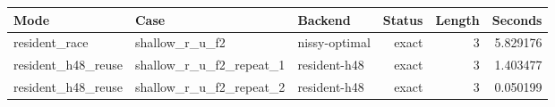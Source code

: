 {\small
\begin{tabular}{lllrrr}
\hline
Mode & Case & Backend & Status & Length & Seconds \\
\hline
resident\_race & shallow\_r\_u\_f2 & nissy-optimal & exact & 3 & 5.829176 \\
resident\_h48\_reuse & shallow\_r\_u\_f2\_repeat\_1 & resident-h48 & exact & 3 & 1.403477 \\
resident\_h48\_reuse & shallow\_r\_u\_f2\_repeat\_2 & resident-h48 & exact & 3 & 0.050199 \\
\hline
\end{tabular}
}
